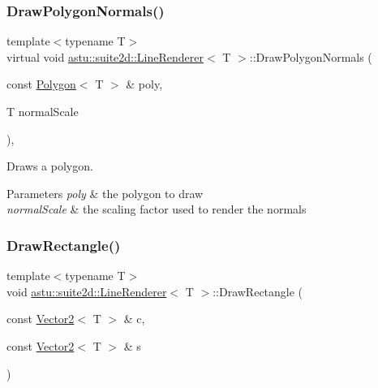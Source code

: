 \subsubsection{\texorpdfstring{Draw\+Polygon\+Normals()}{DrawPolygonNormals()}}
{\footnotesize\ttfamily template$<$typename T$>$ \\
virtual void \hyperlink{classastu_1_1suite2d_1_1LineRenderer}{astu\+::suite2d\+::\+Line\+Renderer}$<$ T $>$\+::Draw\+Polygon\+Normals (\begin{DoxyParamCaption}\item[{const \hyperlink{classastu_1_1Polygon}{Polygon}$<$ T $>$ \&}]{poly,  }\item[{T}]{normal\+Scale }\end{DoxyParamCaption})\hspace{0.3cm}{\ttfamily [inline]}, {\ttfamily [virtual]}}

Draws a polygon.


\begin{DoxyParams}{Parameters}
{\em poly} & the polygon to draw \\
\hline
{\em normal\+Scale} & the scaling factor used to render the normals \\
\hline
\end{DoxyParams}
\mbox{\label{classastu_1_1suite2d_1_1LineRenderer_aaf99e1a7b37bf3c27e2f1803b77e9126}} 
\subsubsection{\texorpdfstring{Draw\+Rectangle()}{DrawRectangle()}\hspace{0.1cm}{\footnotesize\ttfamily [1/2]}}
{\footnotesize\ttfamily template$<$typename T$>$ \\
void \hyperlink{classastu_1_1suite2d_1_1LineRenderer}{astu\+::suite2d\+::\+Line\+Renderer}$<$ T $>$\+::Draw\+Rectangle (\begin{DoxyParamCaption}\item[{const \hyperlink{classastu_1_1Vector2}{Vector2}$<$ T $>$ \&}]{c,  }\item[{const \hyperlink{classastu_1_1Vector2}{Vector2}$<$ T $>$ \&}]{s }\end{DoxyParamCaption})\hspace{0.3cm}{\ttfamily [inline]}}

